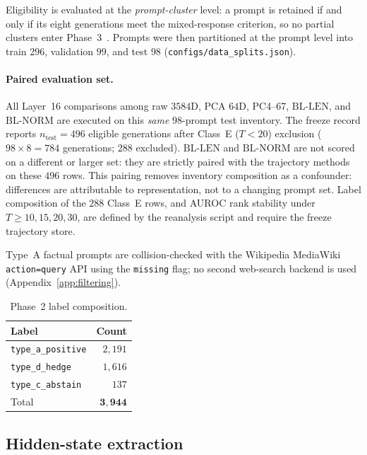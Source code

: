 \documentclass{article}
\newcommand{\bllen}{\mathrm{BL\text{-}LEN}}
\newcommand{\blnorm}{\mathrm{BL\text{-}NORM}}
\begin{document}
Eligibility is evaluated at the \emph{prompt-cluster} level: a prompt is retained if and only if its eight generations meet the mixed-response criterion, so no partial clusters enter Phase~3~\citep{exptrj001plan}. Prompts were then partitioned at the prompt level into train $296$, validation $99$, and test $98$ (\texttt{configs/data\_splits.json}).

\paragraph{Paired evaluation set.}
All Layer~16 comparisons among raw $3584${D}, {PCA} $64${D}, {PC4}--{67}, $\bllen$, and $\blnorm$ are executed on this \emph{same} $98$-prompt test inventory. The freeze record reports $n_{\mathrm{test}}=496$ eligible generations after Class~E ($T<20$) exclusion ($98\times 8=784$ generations; $288$ excluded). $\bllen$ and $\blnorm$ are not scored on a different or larger set: they are strictly paired with the trajectory methods on these $496$ rows. This pairing removes inventory composition as a confounder: differences are attributable to representation, not to a changing prompt set. Label composition of the $288$ Class~E rows, and {AUROC} rank stability under $T\ge 10,15,20,30$, are defined by the reanalysis script and require the freeze trajectory store.

Type~A factual prompts are collision-checked with the {Wikipedia} {MediaWiki} \texttt{action=query} {API} using the \texttt{missing} flag; no second web-search backend is used (Appendix~\ref{app:filtering}).

\begin{table}[t]
\centering
\caption{Phase~2 label composition.}
\label{tab:labels}
\small
\begin{tabular}{@{}lr@{}}
\toprule
Label & Count \\
\midrule
\texttt{type\_a\_positive} & $2{,}191$ \\
\texttt{type\_d\_hedge} & $1{,}616$ \\
\texttt{type\_c\_abstain} & $137$ \\
\midrule
Total & $\mathbf{3{,}944}$ \\
\bottomrule
\end{tabular}
\end{table}

\subsection{Hidden-state extraction}
\label{sec:extract}
\end{document}
